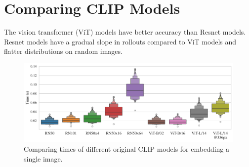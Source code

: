 
\chapter{Comparing CLIP Models}
\label{sec:clip-comparison}

The vision transformer (ViT) models have better accuracy than Resnet models.
Resnet models have a gradual slope in rollouts compared to ViT models and flatter distributions on random images.

\begin{figure}[H]
    \centering
    \includegraphics[width=\textwidth]{images/clip_inference_times.pdf}
    \vspace{-12pt}
    \caption{Comparing times of different original CLIP models for embedding a single image.}
    \label{fig:clip-time-comparison}
\end{figure}

